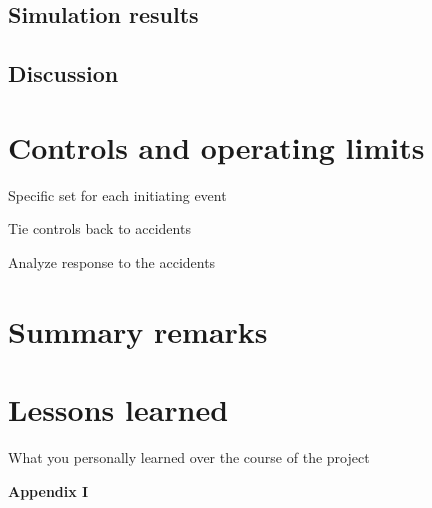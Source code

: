 \documentclass[11pt,a4paper]{article}
\begin{document}
\subsection{Simulation results}

\subsection{Discussion}

\newpage

\section{Controls and operating limits}

Specific set for each initiating event

Tie controls back to accidents

Analyze response to the accidents

\newpage

\section{Summary remarks}

\newpage

\section{Lessons learned}

What you personally learned over the course of the project

%
%

\newpage

\noindent\Large{\textbf{Appendix I}}
\end{document}
